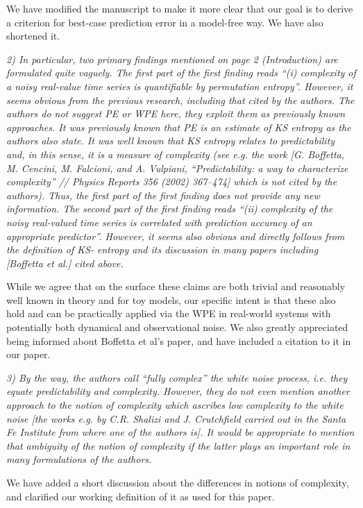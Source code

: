 \documentclass[12pt]{article}
\newcommand{\alert}[1]{{\color{red}#1}}
\begin{document}
\alert{We have modified the manuscript to make it more clear that our goal is to
derive a criterion for best-case prediction error in a model-free way. We have
also shortened it.}

\emph{2) In particular, two primary findings mentioned on page 2 (Introduction)
are formulated quite vaguely. The first part of the first finding reads ``(i)
complexity of a noisy real-value time series is quantifiable by permutation
entropy''. However, it seems obvious from the previous research, including that
cited by the authors. The authors do not suggest PE or WPE here, they exploit
them as previously known approaches. It was previously known that PE is an
estimate of KS entropy as the authors also state. It was well known that KS
entropy relates to predictability and, in this sense, it is a measure of
complexity (see e.g. the work [G. Boffetta, M. Cencini, M. Falcioni, and A.
Vulpiani, ``Predictability: a way to characterize complexity'' // Physics
Reports 356 (2002) 367–474] which is not cited by the authors). Thus, the first
part of the first finding does not provide any new information. The second part
of the first finding reads ``(ii) complexity of the noisy real-valued time
series is correlated with prediction accuracy of an appropriate predictor''.
However, it seems also obvious and directly follows from the definition of KS-
entropy and its discussion in many papers including [Boffetta et al.] cited
above.}

While we agree that on the surface these claims are both trivial and reasonably
well known in theory and for toy models, our specific intent is that these also
hold and can be practically applied via the WPE in real-world systems with
potentially both dynamical and observational noise. We also greatly appreciated
being informed about Boffetta et al's paper, and have included a citation to it
in our paper.

\emph{3) By the way, the authors call ``fully complex'' the white noise process,
i.e. they equate predictability and complexity. However, they do not even
mention another approach to the notion of complexity which ascribes low
complexity to the white noise [the works e.g. by C.R. Shalizi and J. Crutchfield
carried out in the Santa Fe Institute from where one of the authors is]. It
would be appropriate to mention that ambiguity of the notion of complexity if
the latter plays an important role in many formulations of the authors.}

We have added a short discussion about the differences in notions of complexity,
and clarified our working definition of it as used for this paper.
\end{document}
